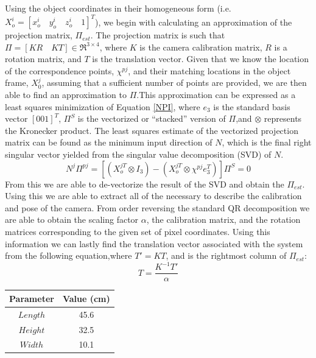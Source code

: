 \documentclass[12pt]{article}
\begin{document}
Using the object coordinates in their homogeneous form (i.e.\ $X_o^i = [x_o^i \quad y_o^i \quad z_o^i \quad 1]^T$), we begin with calculating an approximation of the projection matrix, $\Pi_{est}$. The projection matrix is such that $\Pi = [KR \quad KT] \in \Re^{3\times4}$, where $K$ is the camera calibration matrix, $R$ is a rotation matrix, and $T$ is the translation vector. Given that we know the location of the correspondence points, $\chi^{pj}$, and their matching locations in the object frame, $X_0^j$, assuming that a sufficient number of points are provided, we are then able to find an approximation to $\Pi$.This approximation can be expressed as a least squares minimization of Equation \ref{NPI}, where $e_3$ is the standard basis vector $[0 0 1]^T$, $\Pi^S$ is the vectorized or ``stacked'' version of $\Pi$,and $\otimes$ represents the Kronecker product. The least squares estimate of the vectorized projection matrix can be found as the minimum input direction of $N$, which is the final right singular vector yielded from the singular value decomposition (SVD) of $N$.  
\begin{equation}\label{NPI}
N^j\Pi^{pj} = [(X_o^{jT}\otimes I_3)-(X_o^{jT}\otimes \chi^{pj}e_3^T)]\Pi^S = 0
\end{equation}
From this we are able to de-vectorize the result of the SVD and obtain the $\Pi_{est}$. Using this we are able to extract all of the necessary to describe the calibration and pose of the camera. From order reversing the standard QR decomposition we are able to obtain the scaling factor $\alpha$, the calibration matrix, and the rotation matrices corresponding to the given set of pixel coordinates. Using this information we can lastly find the translation vector associated with the system from the following equation,where $T' = KT$, and is the rightmost column of $\Pi_{est}$: 
\begin{equation*}\label{NPI}
	T = \dfrac{K^{-1}T'}{\alpha}
\end{equation*}

\begin{center}
	\begin{tabular}[5pt]{| c| c|}
	\hline
    Parameter	& Value (cm) \\[0.5ex] 
	\hline 	
	$Length$& 45.6  \\ \hline 
	$Height$& 32.5  \\ \hline 
	$Width$& 10.1  \\ \hline 
\end{tabular}
\label{boxdim}
\end{center}
\end{document}
